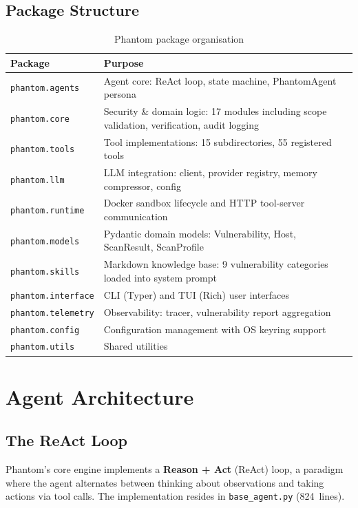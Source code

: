 \documentclass[12pt,a4paper]{report}
\begin{document}
\section{Package Structure}
\begin{table}[H]
\centering
\caption{Phantom package organisation}
\label{tab:packages}
\begin{tabularx}{\textwidth}{lX}
\toprule
\textbf{Package} & \textbf{Purpose} \\
\midrule
\texttt{phantom.agents}    & Agent core: ReAct loop, state machine, PhantomAgent persona \\
\texttt{phantom.core}      & Security \& domain logic: 17 modules including scope validation, verification, audit logging \\
\texttt{phantom.tools}     & Tool implementations: 15 subdirectories, 55 registered tools \\
\texttt{phantom.llm}       & LLM integration: client, provider registry, memory compressor, config \\
\texttt{phantom.runtime}   & Docker sandbox lifecycle and HTTP tool-server communication \\
\texttt{phantom.models}    & Pydantic domain models: Vulnerability, Host, ScanResult, ScanProfile \\
\texttt{phantom.skills}    & Markdown knowledge base: 9 vulnerability categories loaded into system prompt \\
\texttt{phantom.interface}  & CLI (Typer) and TUI (Rich) user interfaces \\
\texttt{phantom.telemetry}  & Observability: tracer, vulnerability report aggregation \\
\texttt{phantom.config}     & Configuration management with OS keyring support \\
\texttt{phantom.utils}      & Shared utilities \\
\bottomrule
\end{tabularx}
\end{table}


\chapter{Agent Architecture}
\label{ch:agent}

\section{The ReAct Loop}
Phantom's core engine implements a \textbf{Reason + Act} (ReAct) loop, a paradigm
where the agent alternates between thinking about observations and taking actions
via tool calls. The implementation resides in \texttt{base\_agent.py} (824~lines).
\end{document}
